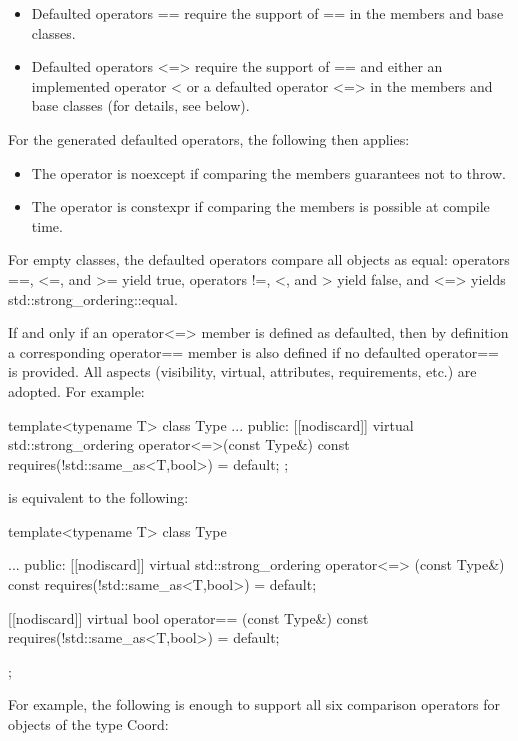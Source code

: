 \begin{itemize}
\item
Defaulted operators == require the support of == in the members and base classes.

\item
Defaulted operators <=> require the support of == and either an implemented operator < or a defaulted operator <=> in the members and base classes (for details, see below).
\end{itemize}

For the generated defaulted operators, the following then applies:

\begin{itemize}
\item
The operator is noexcept if comparing the members guarantees not to throw.

\item
The operator is constexpr if comparing the members is possible at compile time.
\end{itemize}

For empty classes, the defaulted operators compare all objects as equal: operators ==, <=, and >= yield true, operators !=, <, and > yield false, and <=> yields std::strong\_ordering::equal.



If and only if an operator<=> member is defined as defaulted, then by definition a corresponding operator== member is also defined if no defaulted operator== is provided. All aspects (visibility, virtual, attributes, requirements, etc.) are adopted. For example:

\begin{cpp}
template<typename T>
class Type {
	...
	public:
		[[nodiscard]] virtual std::strong_ordering
			operator<=>(const Type&) const requires(!std::same_as<T,bool>) = default;
};
\end{cpp}

is equivalent to the following:

\begin{cpp}
template<typename T>
class Type {
	...
	public:
	[[nodiscard]] virtual std::strong_ordering
		operator<=> (const Type&) const requires(!std::same_as<T,bool>) = default;
	
	[[nodiscard]] virtual bool
		operator== (const Type&) const requires(!std::same_as<T,bool>) = default;
};
\end{cpp}

For example, the following is enough to support all six comparison operators for objects of the type Coord:

